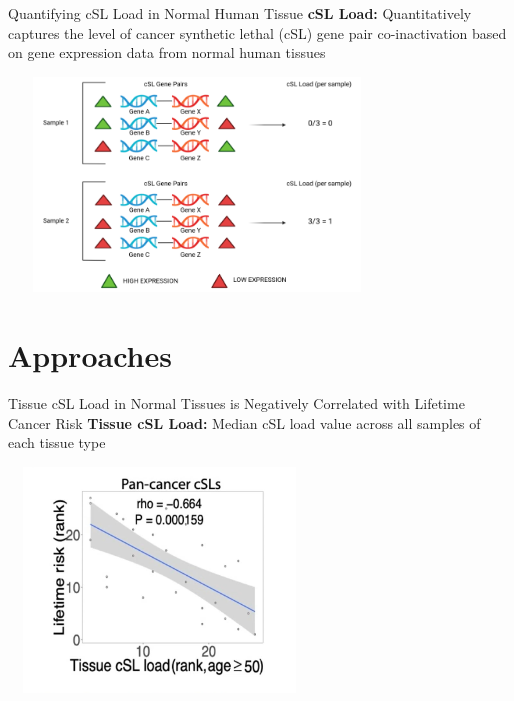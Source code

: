 \documentclass{beamer}
\begin{document}
	\begin{frame}{Quantifying cSL Load in Normal Human Tissue}
			\textbf{\color{blue}cSL Load:} Quantitatively captures the level of cancer synthetic lethal (cSL) gene pair co-inactivation based on gene expression data from normal human tissues
			\begin{center}
				\includegraphics[width=10cm, height=5.7cm]{csl.png}
			\end{center}
	\end{frame}

	\section{Approaches}

	\begin{frame}{Tissue cSL Load in Normal Tissues is Negatively Correlated with Lifetime Cancer Risk}
		\textbf{\color{blue}Tissue cSL Load:} Median cSL load value across all samples of each tissue type
		
		\centering
		\includegraphics[width=8cm, height=6cm]{tcl1.png}
	\end{frame}
\end{document}
